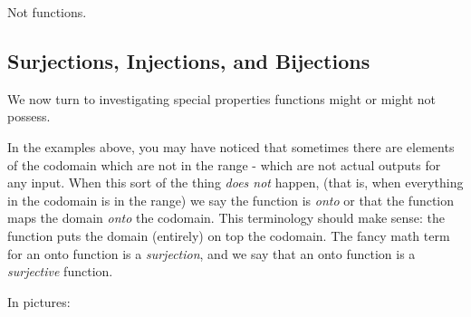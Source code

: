 \documentclass[12pt]{article}
\begin{document}
\begin{example}
\begin{solution}
\begin{center}
\begin{multicols}{2}

    \end{multicols}
  Not functions.
  \end{center}

\end{solution}

\end{example}

\subsection{Surjections, Injections, and Bijections}

We now turn to investigating special properties functions might or might not possess.  

In the examples above, you may have noticed that sometimes there are elements of the codomain which are not in the range - which are not actual outputs for any input.  When this sort of the thing {\em does not} happen, (that is, when everything in the codomain is in the range) we say the function is {\em onto} or that the function maps the domain {\em onto} the codomain.  This terminology should make sense: the function puts the domain (entirely) on top the codomain.  The fancy math term for an onto function is a {\em surjection}, and we say that an onto function is a {\em surjective} function.

In pictures:
\end{document}

